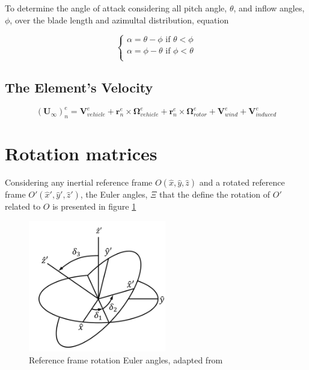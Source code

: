 To determine the angle of attack considering all pitch angle, $\theta$, and inflow angles, $\phi$, over the blade length and azimultal distribution, equation 

\begin{equation}
    \begin{cases}
        \alpha = \theta - \phi \text{ if } \theta < \phi\\
        \alpha = \phi - \theta \text{ if } \phi < \theta\\
    \end{cases}
    \label{eq:angle_of_attack}
\end{equation}

\subsection{The Element's Velocity}
\label{section:element_velocity}


\begin{equation}
    \left(\mathbf{U}_\infty\right)^e_n = \mathbf{V}^e_{vehicle} + \mathbf{r}_n^e \times \boldsymbol{\Omega}_{vehicle}^e + \mathbf{r}_n^e \times \boldsymbol{\Omega}_{rotor}^e + \mathbf{V}_{wind}^e + \mathbf{V}_{induced}^e
\end{equation}


\section{Rotation matrices}
\label{section:rotation_matrices}

Considering any inertial reference frame $O(\hat{x},\hat{y},\hat{z})$ and a rotated reference frame $O'(\hat{x}',\hat{y}',\hat{z}')$, the Euler angles, $\Xi$ that the define the rotation of $O'$ related to $O$ is presented in figure \ref{fig:rotation_frames_img}

\begin{figure}[!htb]
    \centering
    \includegraphics[width=6cm]{Figures/background/rotation_matrices/rotation_frames.png}
    \caption{Reference frame rotation Euler angles, adapted from \cite{schwab_how_2006}}
    \label{fig:rotation_frames_img}
\end{figure}

